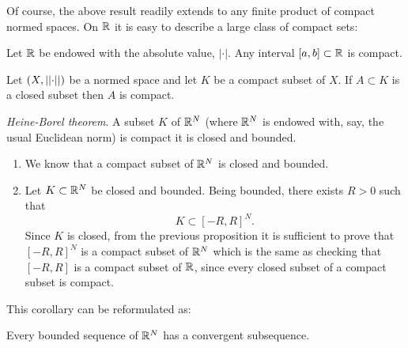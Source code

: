 \documentclass{article}
\begin{document}
Of course, the above result readily extends to any finite product of compact normed spaces. On $\mathbb{R}$ it is easy to describe a large class of compact sets:
\begin{lemma}
	Let $\mathbb{R}$ be endowed with the absolute value, $|\cdot|$. Any interval $[a,b]\subset\mathbb{R}$ is compact.
\end{lemma}
\begin{proposition}
	Let $(X,\left|\left|\cdot\right|\right|)$ be a normed space and let $K$ be a compact subset of $X$. If $A\subset K$ is a closed subset then $A$ is compact.
\end{proposition}
\begin{corollary}
	\emph{Heine-Borel theorem}. A subset $K$ of $\mathbb{R}^{N}$ (where $\mathbb{R}^{N}$ is endowed with, say, the usual Euclidean norm) is compact \ifonly{} it is closed and bounded.
\end{corollary}
\begin{fancyproof}
	\begin{enumerate}
		\item[$\impliedby$] We know that a compact subset of $\mathbb{R}^{N}$ is closed and bounded.
		\item[$\implies$] Let $K\subset\mathbb{R}^{N}$ be closed and bounded. Being bounded, there exists $R>0$ such that
		\begin{equation*}
			K\subset[-R,R]^{N}.
		\end{equation*}
		Since $K$ is closed, from the previous proposition it is sufficient to prove that $[-R,R]^{N}$ is a compact subset of $\mathbb{R}^{N}$ which is the same as checking that $[-R,R]$ is a compact subset of $\mathbb{R}$, since every closed subset of a compact subset is compact.
	\end{enumerate}
\end{fancyproof}
This corollary can be reformulated as:
\begin{center}
	Every bounded sequence of $\mathbb{R}^{N}$ has a convergent subsequence.
\end{center}
\end{document}
